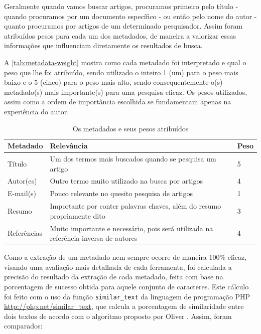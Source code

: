 
Geralmente quando vamos buscar artigos, procuramos primeiro pelo título - quando procuramos por um documento específico - ou então pelo nome do autor - quanto procuramos por artigos de um determinado pesquisador. Assim foram atribuídos pesos para cada um dos metadados, de maneira a valorizar essas informações que influenciam diretamente os resultados de busca.

A \autoref{tab:metadata-weight} mostra como cada metadado foi interpretado e qual o peso que lhe foi atribuído, sendo utilizado o inteiro 1 (um) para o peso mais baixo e o 5 (cinco) para o peso mais alto, sendo consequentemente o(s) metadado(s) mais importante(s) para uma pesquisa eficaz. Os pesos utilizados, assim como a ordem de importância escolhida se fundamentam apenas na experiência do autor.


\begin{table}
    \caption{Os metadados e seus pesos atribuídos}
    \begin{center}
        \begin{tabular}{|p{3cm}|p{8cm}|C{1cm}|}
            \hline \textbf{Metadado} & \textbf{Relevância} & \textbf{Peso} \\ 
            \hline Título & Um dos termos mais buscados quando se pesquisa um artigo & 5 \\
            \hline Autor(es) & Outro termo muito utilizado na busca por artigos & 4 \\
            \hline E-mail(s) & Pouco relevante no quesito pesquisa de artigos & 1 \\
            \hline Resumo & Importante por conter palavras chaves, além do resumo propriamente dito & 3 \\
            \hline Referências & Muito importante e necessário, pois será utilizada na referência inversa de autores & 4 \\
            \hline 
        \end{tabular} 
    \end{center}
    \label{tab:metadata-weight}
\end{table}

Como a extração de um metadado nem sempre ocorre de maneira 100\% eficaz, visando uma avaliação mais detalhada de cada ferramenta, foi calculada a precisão do resultado da extração de cada metadado, feita com base na porcentagem de sucesso obtida para aquele conjunto de caracteres. Este cálculo foi feito com o uso da função \texttt{similar\_text} da linguagem de programação PHP \url{http://php.net/similar_text}, que calcula a porcentagem de similaridade entre dois textos de acordo com o algoritmo proposto por Oliver \cite{oliver-1993}. Assim, foram comparados:

